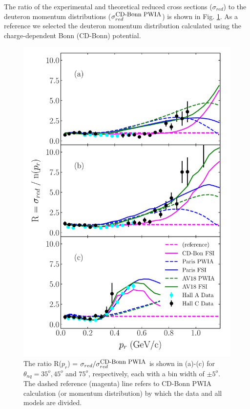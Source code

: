 

\indent The ratio of the experimental and theoretical reduced cross sections ($\sigma_{red}$) to the deuteron momentum distributions ($\sigma^{\textrm{\small CD-Bonn PWIA}}_{red}$) is shown in Fig. \ref{fig:fig2}.
As a reference we selected the deuteron momentum distribution calculated using the charge-dependent Bonn (CD-Bonn) potential\cite{PhysRevC.63.024001}.
\begin{figure}[h!]
\includegraphics[scale=0.5]{../prl_plots/PRL_plot2.pdf}
\caption{The ratio R($p_{r}$) = $\sigma_{red}/\sigma^{\textrm{\small CD-Bonn PWIA}}_{red}$ is shown in (a)-(c) for $\theta_{nq}=35^{o}, 45^{o}$ and $75^{o}$, respectively, each with a bin width of $\pm 5^{o}$.
The dashed reference (magenta) line refers to CD-Bonn PWIA calculation (or momentum distribution) by which the data and all models are divided.}
\label{fig:fig2}
\end{figure} \\
